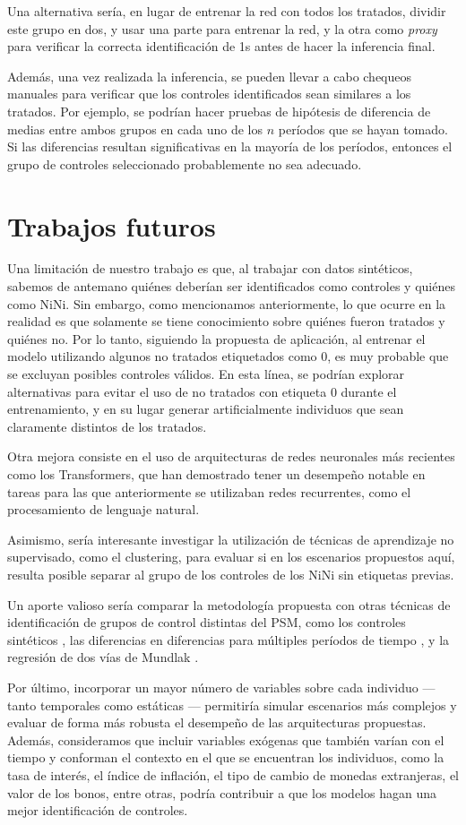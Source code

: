 \documentclass[../main.tex]{subfiles}
\begin{document}
Una alternativa sería, en lugar de entrenar la red con todos los tratados, dividir este
grupo en dos, y usar una parte para entrenar la red, y la otra como \textit{proxy} para
verificar la correcta identificación de 1s antes de hacer la inferencia final.

Además, una vez realizada la inferencia, se pueden llevar a cabo chequeos manuales para
verificar que los controles identificados sean similares a los tratados. Por ejemplo, se
podrían hacer pruebas de hipótesis de diferencia de medias entre ambos grupos en cada uno
de los \(n\) períodos que se hayan tomado. Si las diferencias resultan significativas en
la mayoría de los períodos, entonces el grupo de controles seleccionado probablemente no
sea adecuado.

\section{Trabajos futuros}
Una limitación de nuestro trabajo es que, al trabajar con datos sintéticos, sabemos de
antemano quiénes deberían ser identificados como controles y quiénes como NiNi. Sin
embargo, como mencionamos anteriormente, lo que ocurre en la realidad es que solamente se
tiene conocimiento sobre quiénes fueron tratados y quiénes no. Por lo tanto, siguiendo la
propuesta de aplicación, al entrenar el modelo utilizando algunos no tratados etiquetados
como 0, es muy probable que se excluyan posibles controles válidos. En esta línea, se
podrían explorar alternativas para evitar el uso de no tratados con etiqueta 0 durante el
entrenamiento, y en su lugar generar artificialmente individuos que sean claramente
distintos de los tratados.

Otra mejora consiste en el uso de arquitecturas de redes neuronales más recientes como los
Transformers, que han demostrado tener un desempeño notable en tareas para las que
anteriormente se utilizaban redes recurrentes, como el procesamiento de lenguaje natural.

Asimismo, sería interesante investigar la utilización de técnicas de aprendizaje no
supervisado, como el clustering, para evaluar si en los escenarios propuestos aquí,
resulta posible separar al grupo de los controles de los NiNi sin etiquetas previas.

Un aporte valioso sería comparar la metodología propuesta con otras técnicas de
identificación de grupos de control distintas del PSM, como los controles sintéticos
\cite{abadie2025syntheticcontrolsexperimentaldesign}, las diferencias en diferencias para
múltiples períodos de tiempo \cite{CALLAWAY2021200}, y la regresión de dos vías de Mundlak
\cite{wooldridge-two-way-mundlak-2021}.

Por último, incorporar un mayor número de variables sobre cada individuo — tanto
temporales como estáticas — permitiría simular escenarios más complejos y evaluar de forma
más robusta el desempeño de las arquitecturas propuestas. Además, consideramos que incluir
variables exógenas que también varían con el tiempo y conforman el contexto en el que se
encuentran los individuos, como la tasa de interés, el índice de inflación, el
tipo de cambio de monedas extranjeras, el valor de los bonos, entre otras, podría
contribuir a que los modelos hagan una mejor identificación de controles.
\end{document}
